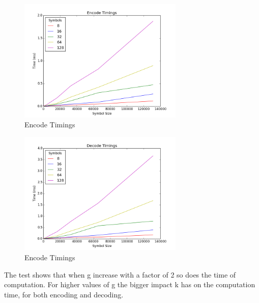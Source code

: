 \begin{figure}[H]
    \centering
    \includegraphics[width=0.7\textwidth]{figures/KodoPython/encode_timings.png}
    \caption{Encode Timings}
    \label{fig:encode_timings}
\end{figure}
\begin{figure}[H]
    \centering
    \includegraphics[width=0.7\textwidth]{figures/KodoPython/decode_timings.png}
    \caption{Encode Timings}
    \label{fig:encode_timings}
\end{figure}

The test shows that when g increase with a factor of 2 so does the time of computation.
For higher values of g the bigger impact k has on the computation time, for both encoding and decoding. 

